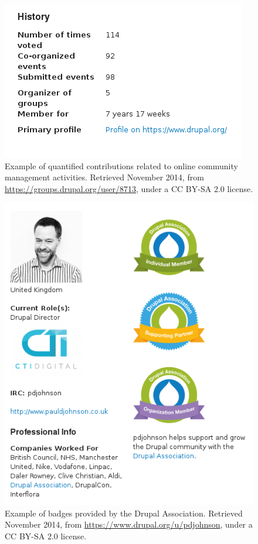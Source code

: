     \begin{figure}[H]
        \centering
\includegraphics[scale=0.5]{img/profiles/groups_drupal_org.png}
        \caption[Example of quantified contributions related to online community management activities]%
        {Example of quantified contributions related to online community management activities. Retrieved  November 2014, from \url{https://groups.drupal.org/user/8713}, under a CC BY-SA 2.0 license.}
        \label{profiles_groups}
    \end{figure}

    \begin{figure}[H]
        \centering
\includegraphics[scale=0.45]{img/profiles/badgets_and_pic.png}
        \caption[Example of badges provided by the Drupal Association]%
        {Example of badges provided by the Drupal Association. Retrieved  November 2014, from \url{https://www.drupal.org/u/pdjohnson}, under a CC BY-SA 2.0 license.}
        \label{profiles_badgets}
    \end{figure}

